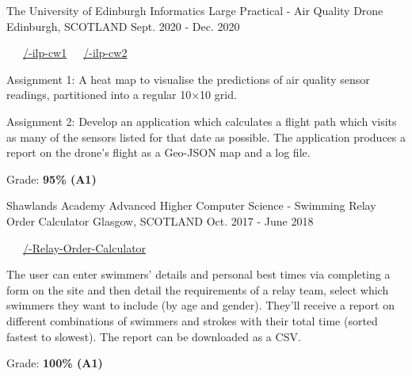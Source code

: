 \begin{cventries}
  \cventry
    {The University of Edinburgh} %
    {Informatics Large Practical - Air Quality Drone} %
    {Edinburgh, SCOTLAND} %
    {Sept. 2020 - Dec. 2020} %
    {
      \color{awesome} \color{graytext}\ \ \ \href{https://github.com/chrisjpm/inf3-ilp-cw1}{\faGithub\acvHeaderIconSep\@chrisjpm/-ilp-cw1}\ \ \ \href{https://github.com/chrisjpm/inf3-ilp-cw2}{\faGithub\acvHeaderIconSep\@chrisjpm/-ilp-cw2}
      \vspace{1.6em}
      \begin{cvitems} %
        \item Assignment 1: A heat map to visualise the predictions of air quality sensor readings, partitioned into a regular 10×10 grid.
        \item Assignment 2: Develop an application which calculates a flight path which visits as many of the sensors listed for that date as possible. The application produces a report on the drone’s flight as a Geo-JSON map and a log file.
        \item Grade: \textbf{95\% (A1)}
      \end{cvitems}
    }
  \cventry
    {Shawlands Academy} %
    {Advanced Higher Computer Science - Swimming Relay Order Calculator} %
    {Glasgow, SCOTLAND} %
    {Oct. 2017 - June 2018} %
    {
      \color{awesome}        \color{graytext}\ \ \ \href{https://github.com/chrisjpm/Swimming-Relay-Order-Calculator}{\faGithub\acvHeaderIconSep\@chrisjpm/\@Swimming-Relay-Order-Calculator}
      \vspace{1.6em}
      \begin{cvitems} %
        \item The user can enter swimmers' details and personal best times via completing a form on the site and then detail the requirements of a relay team, select which swimmers they want to include (by age and gender). They'll receive a report on different combinations of swimmers and strokes with their total time (sorted fastest to slowest). The report can be downloaded as a CSV.
        \item Grade: \textbf{100\% (A1)}
      \end{cvitems}
    }
\end{cventries}
\vspace{-.5em}

